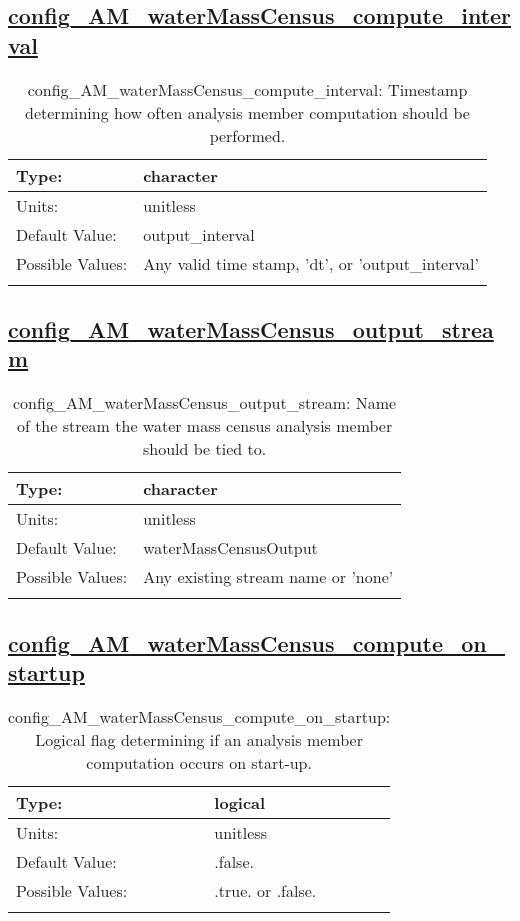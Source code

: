 \subsection[config\_AM\_waterMassCensus\_compute\_interval]{\hyperref[sec:nm_tab_AM_waterMassCensus]{config\_AM\_waterMassCensus\_compute\_interval}}
\label{subsec:nm_sec_config_AM_waterMassCensus_compute_interval}
\begin{center}
\begin{longtable}{| p{2.0in} || p{4.0in} |}
    \hline
    Type: & character \\
    \hline
    Units: & \si{unitless} \\
    \hline
    Default Value: & output\_interval \\
    \hline
    Possible Values: & Any valid time stamp, 'dt', or 'output\_interval' \\
    \hline
    \caption{config\_AM\_waterMassCensus\_compute\_interval: Timestamp determining how often analysis member computation should be performed.}
\end{longtable}
\end{center}
\subsection[config\_AM\_waterMassCensus\_output\_stream]{\hyperref[sec:nm_tab_AM_waterMassCensus]{config\_AM\_waterMassCensus\_output\_stream}}
\label{subsec:nm_sec_config_AM_waterMassCensus_output_stream}
\begin{center}
\begin{longtable}{| p{2.0in} || p{4.0in} |}
    \hline
    Type: & character \\
    \hline
    Units: & \si{unitless} \\
    \hline
    Default Value: & waterMassCensusOutput \\
    \hline
    Possible Values: & Any existing stream name or 'none' \\
    \hline
    \caption{config\_AM\_waterMassCensus\_output\_stream: Name of the stream the water mass census analysis member should be tied to.}
\end{longtable}
\end{center}
\subsection[config\_AM\_waterMassCensus\_compute\_on\_startup]{\hyperref[sec:nm_tab_AM_waterMassCensus]{config\_AM\_waterMassCensus\_compute\_on\_startup}}
\label{subsec:nm_sec_config_AM_waterMassCensus_compute_on_startup}
\begin{center}
\begin{longtable}{| p{2.0in} || p{4.0in} |}
    \hline
    Type: & logical \\
    \hline
    Units: & \si{unitless} \\
    \hline
    Default Value: & .false. \\
    \hline
    Possible Values: & .true. or .false. \\
    \hline
    \caption{config\_AM\_waterMassCensus\_compute\_on\_startup: Logical flag determining if an analysis member computation occurs on start-up.}
\end{longtable}
\end{center}
